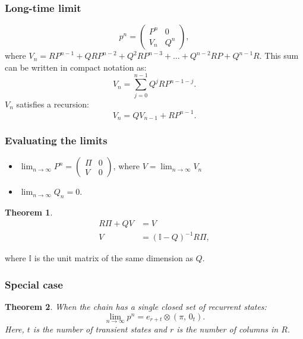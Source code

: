 \documentclass{article}
\newtheorem{theorem}{Theorem}
\begin{document}
\subsubsection{Long-time limit}
\begin{equation}
    p^n = \begin{pmatrix}
        P^n & 0 \\ V_n & Q^n
    \end{pmatrix},
\end{equation}
where $V_n = RP^{n-1} + QRP^{n-2} + Q^2RP^{n-3} + \ldots + Q^{n-2}RP + Q^{n-1}R$. This sum can be written in compact notation as:
\begin{equation}
    V_n = \sum_{j=0}^{n-1}Q^jRP^{n-1-j}.
\end{equation}
$V_n$ satisfies a recursion:
\begin{equation}
    V_n = QV_{n-1} + RP^{n-1}.
\end{equation}

\subsubsection{Evaluating the limits}
\begin{itemize}
    \item $\lim_{n\to\infty} P^n = \begin{pmatrix}
        \Pi & 0 \\ V & 0
    \end{pmatrix}$,\quad
    where $V = \lim_{n\to\infty} V_n$
    \item $\lim_{n\to\infty} Q_n = 0$.
\end{itemize}
\begin{theorem}
    \begin{align}
        R\Pi + QV &= V \\
        V &= (\mathbb{I}-Q)^{-1} R\Pi, \label{eq:V_Matrix}
    \end{align}
\end{theorem}
 where $\mathbb{I}$ is the unit matrix of the same dimension as $Q$.
 \subsubsection{Special case}
 \begin{theorem}
     When the chain has a single closed set of recurrent states:
     \begin{equation}
         \lim_{n\to\infty}p^n = e_{r+t}\otimes(\pi,\,0_t).
     \end{equation}
     Here, $t$ is the number of transient states and $r$ is the number of columns in $R$.
 \end{theorem}
 
\end{document}
